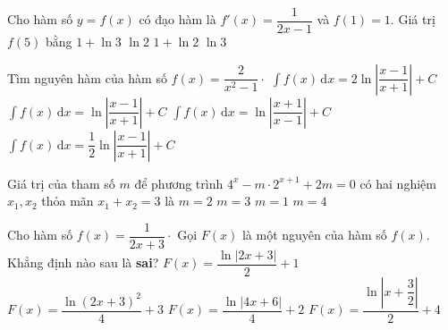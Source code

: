\begin{ex}%
	Cho hàm số $y=f(x)$ có đạo hàm là $f'(x)=\dfrac{1}{2x-1}$ và $f(1)=1$. Giá trị $f(5)$ bằng
	\choice
	{\True $1+\ln 3$}
	{$\ln 2$}
	{$1+\ln 2$}
	{$\ln 3$}
\end{ex}
\begin{ex}%
	Tìm nguyên hàm của hàm số $f(x)=\dfrac{2}{x^2-1}\cdot$
	\choice
	{$\displaystyle\int{f(x)\mathrm{\,d}x=2\ln \left| \dfrac{x-1}{x+1}\right|+C}$}
	{\True $\displaystyle\int{f(x)\mathrm{\,d}x=\ln \left| \dfrac{x-1}{x+1}\right|+C}$}
	{$\displaystyle\int{f(x)\mathrm{\,d}x=\ln \left| \dfrac{x+1}{x-1}\right|+C}$}
	{$\displaystyle\int{f(x)\mathrm{\,d}x=\dfrac{1}{2}\ln \left| \dfrac{x-1}{x+1}\right|+C}$}
\end{ex}
\begin{ex}%
	Giá trị của tham số $ m $ để phương trình $4^x-m \cdot 2^{x+1}+2m=0$ có hai nghiệm $x_1, x_2$ thỏa mãn $x_1+x_2=3$ là
	\choice
	{$m=2$}
	{$m=3$}
	{$m=1$}
	{\True $m=4$}
\end{ex}
\begin{ex}%
	Cho hàm số $f(x)=\dfrac{1}{2x+3}\cdot$ Gọi $F(x)$ là một nguyên của hàm số $f(x)$. Khẳng định nào sau là \textbf{sai}?
	\choice
	{$F(x)=\dfrac{\ln \left|2x+3\right|}{2}+1$}
	{$F(x)=\dfrac{\ln {\left(2x+3\right)}^2}{4}+3$}
	{\True $F(x)=\dfrac{\ln \left| 4x+6\right|}{4}+2$}
	{$F(x)=\dfrac{\ln \left| x+\dfrac{3}{2}\right|}{2}+4$}
\end{ex}
